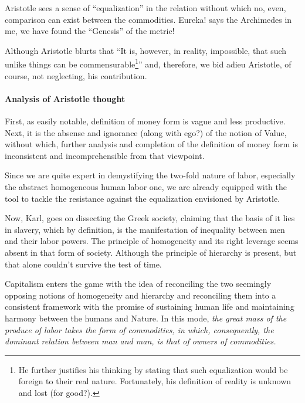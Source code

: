 \documentclass[12pt]{extarticle}
\theoremstyle{definition}
\begin{document}
Aristotle sees a sense of ``equalization'' in the relation without which no, even, comparison can exist between the commodities.  Eureka! says the Archimedes in me, we have found the ``Genesis'' of the metric!

Although Aristotle blurts that ``It is, however, in reality, impossible, that such unlike things can be commensurable\footnote{He further justifies his thinking by stating that such equalization would be foreign to their real nature.  Fortunately, his definition of reality is unknown and lost (for good?).}'' and, therefore, we bid adieu Aristotle, of course, not neglecting, his contribution.

\paragraph{Analysis of Aristotle thought}
First, as easily notable, definition of money form is vague and less productive.  Next, it is the absense and ignorance (along with ego?) of the notion of Value, without which, further analysis and completion of the definition of money form is inconsistent and incomprehensible from that viewpoint.

Since we are quite expert in demystifying the two-fold nature of labor, especially the abstract homogeneous human labor one, we are already equipped with the tool to tackle the resistance against the equalization envisioned by Aristotle.

Now, Karl, goes on dissecting the Greek society, claiming that the basis of it lies in slavery, which by definition, is the manifestation of inequality between men and their labor powers.  The principle of homogeneity and its right leverage seems absent in that form of society.  Although the principle of hierarchy is present, but that alone couldn't survive the test of time.

Capitalism enters the game with the idea of reconciling the two seemingly opposing notions of homogeneity and hierarchy and reconciling them into a consistent framework with the promise of sustaining human life and maintaining harmony between the humans and Nature.  In this mode, \emph{the great mass of the produce of labor takes the form of commodities, in which, consequently, the dominant relation between man and man, is that of owners of commodities.}
\end{document}
